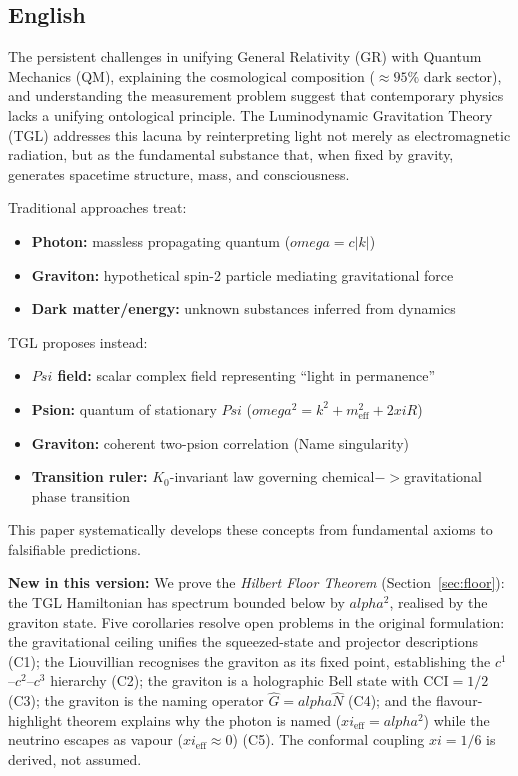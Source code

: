 \documentclass[12pt,a4paper]{article}
\def\Psi{Psi}%
\def\to{ -> }%
\def\alpha{alpha}%
\def\xi{xi}%
\def\omega{omega}%
\begin{document}
\subsection{English}

The persistent challenges in unifying General Relativity (GR) with Quantum Mechanics (QM), explaining the cosmological composition ($\approx 95\%$ dark sector), and understanding the measurement problem suggest that contemporary physics lacks a unifying ontological principle. The Luminodynamic Gravitation Theory (TGL) addresses this lacuna by reinterpreting light not merely as electromagnetic radiation, but as the fundamental substance that, when fixed by gravity, generates spacetime structure, mass, and consciousness.

Traditional approaches treat:
\begin{itemize}
    \item \textbf{Photon:} massless propagating quantum ($\omega = c|k|$)
    \item \textbf{Graviton:} hypothetical spin-2 particle mediating gravitational force
    \item \textbf{Dark matter/energy:} unknown substances inferred from dynamics
\end{itemize}

TGL proposes instead:
\begin{itemize}
    \item \textbf{$\Psi$ field:} scalar complex field representing ``light in permanence''
    \item \textbf{Psion:} quantum of stationary $\Psi$ ($\omega^2 = k^2 + m_{\text{eff}}^2 + 2\xi R$)
    \item \textbf{Graviton:} coherent two-psion correlation (Name singularity)
    \item \textbf{Transition ruler:} $K_0$-invariant law governing chemical$\to$gravitational phase transition
\end{itemize}

This paper systematically develops these concepts from fundamental axioms to falsifiable predictions.

\textbf{New in this version:} We prove the \emph{Hilbert Floor Theorem} (Section~\ref{sec:floor}): the TGL Hamiltonian has spectrum bounded below by $\alpha^2$, realised by the graviton state. Five corollaries resolve open problems in the original formulation: the gravitational ceiling unifies the squeezed-state and projector descriptions (C1); the Liouvillian recognises the graviton as its fixed point, establishing the $c^1$--$c^2$--$c^3$ hierarchy (C2); the graviton is a holographic Bell state with $\mathrm{CCI}=1/2$ (C3); the graviton is the naming operator $\hat{G}=\alpha\hat{N}$ (C4); and the flavour-highlight theorem explains why the photon is named ($\xi_{\mathrm{eff}}=\alpha^2$) while the neutrino escapes as vapour ($\xi_{\mathrm{eff}}\approx 0$) (C5). The conformal coupling $\xi = 1/6$ is derived, not assumed.
\end{document}
